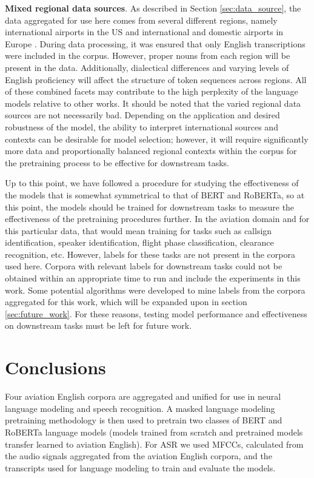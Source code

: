 \documentclass[12pt]{article}
\begin{document}
\textbf{Mixed regional data sources}. As described in Section \ref{sec:data_source}, the data aggregated for use here comes from several different
regions, namely international airports in the US \cite{godfrey_air_1994} and international and domestic airports in Europe
\cite{smidl_air_2019,hofbauer_atcosim_2008,szoke_detecting_2021}. During data processing, it was ensured that only English transcriptions were
included in the corpus. However, proper nouns from each region will be present in the data. Additionally, dialectical differences and varying levels
of English proficiency will affect the structure of token sequences across regions. All of these combined facets may contribute to the high perplexity
of the language models relative to other works. It should be noted that the varied regional data sources are not necessarily bad. Depending on the
application and desired robustness of the model, the ability to interpret international sources and contexts can be desirable for model selection;
however, it will require significantly more data and proportionally balanced regional contexts within the corpus for the pretraining process to be
effective for downstream tasks.

Up to this point, we have followed a procedure for studying the effectiveness of the models that is somewhat symmetrical to that of BERT and RoBERTa,
so at this point, the models should be trained for downstream tasks to measure the effectiveness of the pretraining procedures further. In the
aviation domain and for this particular data, that would mean training for tasks such as callsign identification, speaker identification, flight phase
classification, clearance recognition, etc. However, labels for these tasks are not present in the corpora used here. Corpora with relevant labels for
downstream tasks could not be obtained within an appropriate time to run and include the experiments in this work. Some potential algorithms were
developed to mine labels from the corpora aggregated for this work, which will be expanded upon in section \ref{sec:future_work}. For these reasons,
testing model performance and effectiveness on downstream tasks must be left for future work.

\section{Conclusions}\label{sec:conclusion}
Four aviation English corpora are aggregated and unified for use in neural language modeling and speech recognition. A masked language modeling
pretraining methodology is then used to pretrain two classes of BERT and RoBERTa language models (models trained from scratch and pretrained models
transfer learned to aviation English). For ASR we used MFCCs, calculated from the audio signals aggregated from the aviation English corpora, and the
transcripts used for language modeling to train and evaluate the models.
\end{document}
